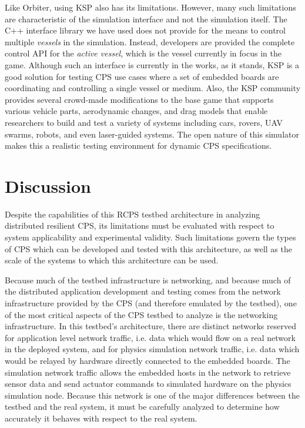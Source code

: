 Like Orbiter, using KSP also has its limitations. However, many such limitations are characteristic of the simulation interface and not the simulation itself. The C++ interface library we have used does not provide for the means to control multiple \emph{vessels} in the simulation. Instead, developers are provided the complete control API for the \emph{active vessel}, which is the vessel currently in focus in the game. Although such an interface is currently in the works, as it stands, KSP is a good solution for testing CPS use cases where a set of embedded boards are coordinating and controlling a single vessel or medium. Also, the KSP community provides several crowd-made modifications to the base game that supports various vehicle parts, aerodynamic changes, and drag models that enable researchers to build and test a variety of systems including cars, rovers, UAV swarms, robots, and even laser-guided systems. The open nature of this simulator makes this a realistic testing environment for dynamic CPS specifications.   
 


\section{Discussion}
\label{sec:Discussion}

Despite the capabilities of this RCPS testbed architecture in analyzing distributed resilient CPS, its limitations must be evaluated with respect to system applicability and experimental validity. Such limitations govern the types of CPS which can be developed and tested with this architecture, as well as the scale of the systems to which this architecture can be used. 

Because much of the testbed infrastructure is networking, and because much of the distributed application development and testing comes from the network infrastructure provided by the CPS (and therefore emulated by the testbed), one of the most critical aspects of the CPS testbed to analyze is the networking infrastructure.  In this testbed's architecture, there are distinct networks reserved for application level network traffic, i.e. data which would flow on a real network in the deployed system, and for physics simulation network traffic, i.e. data which would be relayed by hardware directly connected to the embedded boards.  The simulation network traffic allows the embedded hosts in the network to retrieve sensor data and send actuator commands to simulated hardware on the physics simulation node.  Because this network is one of the major differences between the testbed and the real system, it must be carefully analyzed to determine how accurately it behaves with respect to the real system.  

